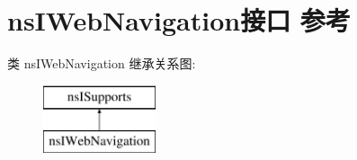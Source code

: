 \hypertarget{interfacens_i_web_navigation}{}\section{ns\+I\+Web\+Navigation接口 参考}
\label{interfacens_i_web_navigation}
类 ns\+I\+Web\+Navigation 继承关系图\+:\begin{figure}[H]
\begin{center}
\leavevmode
\includegraphics[height=2.000000cm]{interfacens_i_web_navigation}
\end{center}
\end{figure}
